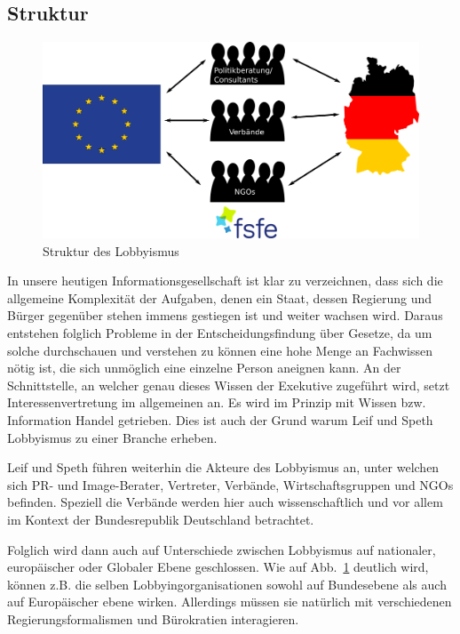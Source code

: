 \subsection{Struktur}
\begin{figure}[h]
	\includegraphics[width=\textwidth]{struktur}
	\centering
	\caption{Struktur des Lobbyismus}
	\label{fig:structure_image}
\end{figure}
In unsere heutigen Informationsgesellschaft ist klar zu verzeichnen, dass sich
die allgemeine Komplexität der Aufgaben, denen ein Staat, dessen Regierung und 
Bürger gegenüber stehen immens gestiegen ist und weiter wachsen wird.
Daraus entstehen folglich Probleme in der Entscheidungsfindung über Gesetze, da 
um solche durchschauen und verstehen zu können eine hohe Menge an Fachwissen 
nötig ist, die sich unmöglich eine einzelne Person aneignen kann. An der 
Schnittstelle, an welcher genau dieses Wissen der Exekutive zugeführt wird, 
setzt Interessenvertretung im allgemeinen an. Es wird im Prinzip mit Wissen 
bzw. Information Handel getrieben. Dies ist auch der Grund warum Leif und 
Speth\cite{LeifSpeth200312} Lobbyismus zu einer Branche erheben.

Leif und Speth führen weiterhin die Akteure des Lobbyismus an, unter 
welchen sich PR- und Image-Berater, Vertreter, Verbände, Wirtschaftsgruppen und 
NGOs befinden. Speziell die Verbände werden hier auch wissenschaftlich 
und vor allem im Kontext der Bundesrepublik Deutschland betrachtet.

Folglich wird dann auch auf Unterschiede zwischen Lobbyismus auf nationaler, 
europäischer oder Globaler Ebene geschlossen. Wie auf 
Abb.~\ref{fig:structure_image} 
deutlich wird, können z.B. die selben Lobbyingorganisationen sowohl auf 
Bundesebene als auch auf Europäischer ebene wirken. Allerdings müssen sie 
natürlich mit verschiedenen Regierungsformalismen und Bürokratien interagieren.

